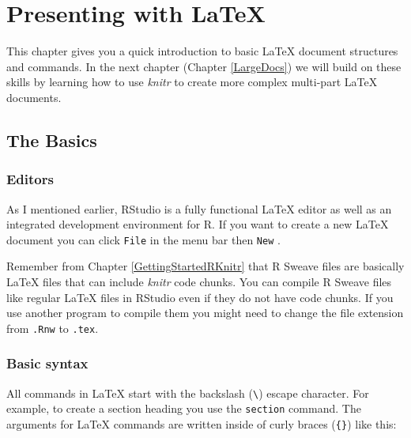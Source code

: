 



\chapter{Presenting with LaTeX}\label{LatexChapter}

This chapter gives you a quick introduction to basic LaTeX document structures and commands. In the next chapter (Chapter \ref{LargeDocs}) we will build on these skills by learning how to use {\emph{knitr}} to create more complex multi-part LaTeX documents. 


\section{The Basics}

\subsection{Editors}

As I mentioned earlier, RStudio is a fully functional LaTeX editor as well as an integrated development environment for R. If you want to create a new LaTeX document you can click {\tt{File}} in the menu bar then {\tt{New}} . 

Remember from Chapter \ref{GettingStartedRKnitr} that R Sweave files are basically LaTeX files that can include {\emph{knitr}} code chunks. You can compile R Sweave files like regular LaTeX files in RStudio even if they do not have code chunks. If you use another program to compile them you might need to change the file extension from {\tt{.Rnw}} to {\tt{.tex}}.

\subsection{Basic syntax}

All commands in LaTeX start with the backslash (\texttt{\textbackslash{}}) escape character. For example, to create a section heading you use the \texttt{section} command. The arguments for LaTeX commands are written inside of curly braces (\texttt{\{\}}) like this:

